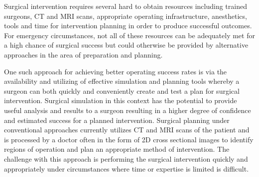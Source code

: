 





Surgical intervention requires several hard to obtain resources including trained surgeons, CT and MRI scans, appropriate operating infrastructure, anesthetics, tools and time for intervention planning in order to produce successful outcomes. For emergency circumstances, not all of these resources can be adequately met for a high chance of surgical success but could otherwise be provided by alternative approaches in the area of preparation and planning.

One such approach for achieving better operating success rates is via the availability and utilizing of effective simulation and planning tools whereby a surgeon can both quickly and conveniently create and test a plan for surgical intervention. Surgical simulation in this context has the potential to provide useful analysis and results to a surgeon resulting in a higher degree of confidence and estimated success for a planned intervention. Surgical planning under conventional approaches currently utilizes CT and MRI scans of the patient and is processed by a doctor often in the form of 2D cross sectional images to identify regions of operation and plan an appropriate method of intervention. The challenge with this approach is performing the surgical intervention quickly and appropriately under circumstances where time or expertise is limited is difficult.

